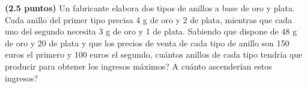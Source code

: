 
\textbf{(2.5 puntos)} Un fabricante elabora dos tipos de anillos a base de oro y plata. Cada anillo del primer tipo precisa 4 g de oro y 2 de plata, mientras que cada uno del segundo necesita 3 g de oro y 1 de plata. Sabiendo que dispone de 48 g de oro y 20 de plata y que los precios de venta de cada tipo de anillo son 150 euros el primero y 100 euros el segundo, \textquestiondown{}cuántos anillos de cada tipo tendría que producir para obtener los ingresos máximos? \textquestiondown{}A cuánto ascenderían estos ingresos?
